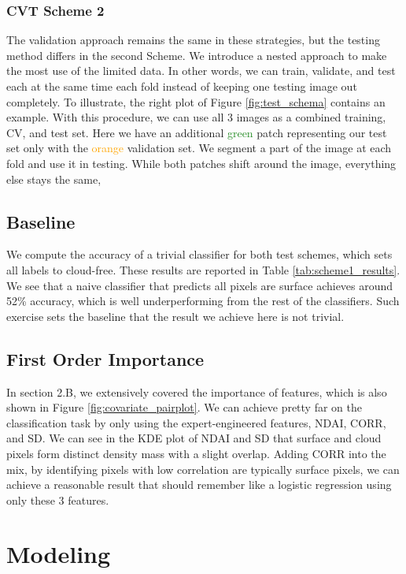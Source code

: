 \documentclass[11pt, letterpaper, journal]{IEEEtran}
\begin{document}
\subsubsection{CVT Scheme 2}
The validation approach remains the same in these strategies, but the testing method differs in the second Scheme. We introduce a nested approach to make the most use of the limited data. In other words, we can train, validate, and test each at the same time each fold instead of keeping one testing image out completely. To illustrate, the right plot of Figure \ref{fig:test_schema} contains an example. With this procedure, we can use all 3 images as a combined training, CV, and test set. Here we have an additional \textcolor{ForestGreen}{green} patch representing our test set only with the \textcolor{orange}{orange} validation set. We segment a part of the image at each fold and use it in testing. While both patches shift around the image, everything else stays the same, 

\subsection{Baseline}
We compute the accuracy of a trivial classifier for both test schemes, which sets all labels to cloud-free. These results are reported in Table \ref{tab:scheme1_results}. We see that a naive classifier that predicts all pixels are surface achieves around 52\% accuracy, which is well underperforming from the rest of the classifiers. Such exercise sets the baseline that the result we achieve here is not trivial.

\subsection{First Order Importance}
In section 2.B, we extensively covered the importance of features, which is also shown in Figure \ref{fig:covariate_pairplot}. We can achieve pretty far on the classification task by only using the expert-engineered features, NDAI, CORR, and SD. We can see in the KDE plot of NDAI and SD that surface and cloud pixels form distinct density mass with a slight overlap. Adding CORR into the mix, by identifying pixels with low correlation are typically surface pixels, we can achieve a reasonable result that should remember like a logistic regression using only these 3 features.


\section{Modeling}
\end{document}
